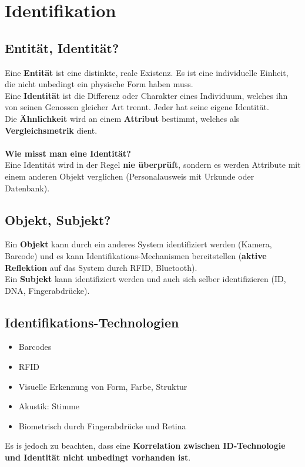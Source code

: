 \documentclass[a4paper]{article}
\begin{document}
\newpage
\section{Identifikation}
\subsection{Entität, Identität?}
Eine \textbf{Entität} ist eine distinkte, reale Existenz. Es ist eine individuelle Einheit, die nicht unbedingt ein physische Form haben muss.\\
Eine \textbf{Identität} ist die Differenz oder Charakter eines Individuum, welches ihn von seinen Genossen gleicher Art trennt. Jeder hat seine eigene Identität.\\
Die \textbf{Ähnlichkeit} wird an einem \textbf{Attribut} bestimmt, welches als \textbf{Vergleichsmetrik} dient.\\
\\
\textbf{Wie misst man eine Identität?}\\

Eine Identität wird in der Regel \textbf{nie überprüft}, sondern es werden Attribute mit einem anderen Objekt verglichen (Personalausweis mit Urkunde oder Datenbank).
\subsection{Objekt, Subjekt?}
Ein \textbf{Objekt} kann durch ein anderes System identifiziert werden (Kamera, Barcode) und es kann Identifikations-Mechanismen bereitstellen (\textbf{aktive Reflektion} auf das System durch RFID, Bluetooth).\\
Ein \textbf{Subjekt} kann identifiziert werden und auch sich selber identifizieren (ID, DNA, Fingerabdrücke).

\subsection{Identifikations-Technologien}
\begin{itemize}
	\item Barcodes
	\item RFID
	\item Visuelle Erkennung von Form, Farbe, Struktur
	\item Akustik: Stimme
	\item Biometrisch durch Fingerabdrücke und Retina
\end{itemize}
Es is jedoch zu beachten, dass eine \textbf{Korrelation zwischen ID-Technologie und Identität nicht unbedingt vorhanden ist}.
\end{document}
